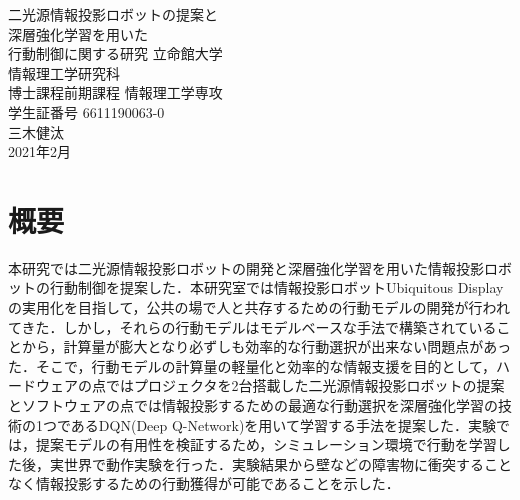 \documentclass[12pt]{sonota/aislab}
\begin{document}

\begin{titlepage}
\centering
\vspace*{3truecm}
\Huge


二光源情報投影ロボットの提案と\\
深層強化学習を用いた\\
行動制御に関する研究
\vfill
\Large
立命館大学\\
情報理工学研究科\\
博士課程前期課程 情報理工学専攻\\[1zh]
学生証番号 6611190063-0\\[0.5zh]
{\LARGE{三木健汰}}\\[2zh]
2021年2月
\end{titlepage}


\let\cleardoublepage\clearpage

\frontmatter

\clearpage
{}
\chapter*{概要}
本研究では二光源情報投影ロボットの開発と深層強化学習を用いた情報投影ロボットの行動制御を提案した．本研究室では情報投影ロボットUbiquitous Displayの実用化を目指して，公共の場で人と共存するための行動モデルの開発が行われてきた．しかし，それらの行動モデルはモデルベースな手法で構築されていることから，計算量が膨大となり必ずしも効率的な行動選択が出来ない問題点があった．そこで，行動モデルの計算量の軽量化と効率的な情報支援を目的として，ハードウェアの点ではプロジェクタを2台搭載した二光源情報投影ロボットの提案とソフトウェアの点では情報投影するための最適な行動選択を深層強化学習の技術の1つであるDQN(Deep Q-Network)を用いて学習する手法を提案した．実験では，提案モデルの有用性を検証するため，シミュレーション環境で行動を学習した後，実世界で動作実験を行った．実験結果から壁などの障害物に衝突することなく情報投影するための行動獲得が可能であることを示した．
\end{document}
